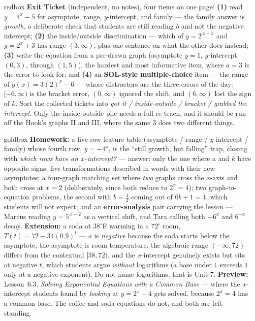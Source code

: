 \documentclass[10pt]{article}
\begin{document}
\begin{skillbox}{redbox}
\textbf{Exit Ticket} (independent, no notes), four items on one page: \textbf{(1)} read $y=4^{x}-5$
for asymptote, range, $y$-intercept, and family --- the family answer is \emph{growth}, a deliberate
check that students are still reading $b$ and not the negative intercept; \textbf{(2)} the
inside/outside discrimination --- which of $y=2^{\,x+3}$ and $y=2^{x}+3$ has range $(3,\infty)$, plus
one sentence on what the other does instead; \textbf{(3)} write the equation from a pre-drawn graph
(asymptote $y=1$, $y$-intercept $(0,3)$, through $(1,5)$), the hardest and most informative item, where
$a=3$ is the error to look for; and \textbf{(4)} an \textbf{SOL-style multiple-choice} item --- the
range of $g(x)=3(2)^{x}-6$ --- whose distractors are the three errors of the day: $[-6,\infty)$ is the
bracket error, $(0,\infty)$ ignored the shift, and $(6,\infty)$ lost the sign of $k$. Sort the collected
tickets into \emph{got it / inside-outside / bracket / grabbed the intercept}. Only the inside-outside
pile needs a full re-teach, and it should be run off the Hook's graphs II and III, where the same $3$
does two different things.
\end{skillbox}

\begin{skillbox}{goldbox}
\textbf{Homework:} a five-row feature table (asymptote / range / $y$-intercept / family) whose fourth
row, $y=-4^{x}$, is the ``still growth, but falling'' trap, closing with \emph{which rows have an
$x$-intercept?} --- answer: only the one where $a$ and $k$ have opposite signs; five transformations
described in words with their new asymptotes; a four-graph matching set where \emph{two} graphs cross
the $x$-axis and both cross at $x=2$ (deliberately, since both reduce to $2^{x}=4$); two graph-to-equation
problems, the second with $b=\frac12$ coming out of $6b+1=4$, which students will not expect; and an
\textbf{error-analysis} pair carrying the lesson --- Marcus reading $y=5^{\,x-2}$ as a vertical shift,
and Tara calling both $-6^{x}$ and $6^{-x}$ decay. \textbf{Extension:} a soda at $38^{\circ}$F warming
in a $72^{\circ}$ room, $T(t)=72-34(0.9)^{t}$ --- $a$ is \emph{negative} because the soda starts below
the asymptote, the asymptote is room temperature, the algebraic range $(-\infty,72)$ differs from the
contextual $[38,72)$, and the $x$-intercept genuinely exists but sits at negative $t$, which students
argue \emph{without} logarithms (a base under $1$ exceeds $1$ only at a negative exponent). Do not name
logarithms; that is Unit 7. \textbf{Preview:} Lesson~6.3, \emph{Solving Exponential Equations with a
Common Base} --- where the $x$-intercept students found by \emph{looking} at $y=2^{x}-4$ gets solved,
because $2^{x}=4$ has a common base. The coffee and soda equations do not, and both are left standing.
\end{skillbox}
\end{document}
